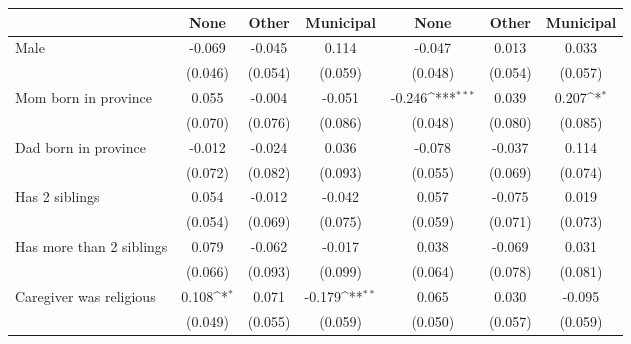 {
\def\sym#1{\ifmmode^{#1}\else\(^{#1}\)\fi}
\begin{tabular}{l*{6}{c}}
\toprule
                    &\multicolumn{1}{c}{None}&\multicolumn{1}{c}{Other}&\multicolumn{1}{c}{Municipal}&\multicolumn{1}{c}{None}&\multicolumn{1}{c}{Other}&\multicolumn{1}{c}{Municipal}\\
\midrule
Male                &      -0.069         &      -0.045         &       0.114         &      -0.047         &       0.013         &       0.033         \\
                    &     (0.046)         &     (0.054)         &     (0.059)         &     (0.048)         &     (0.054)         &     (0.057)         \\
\addlinespace
Mom born in province&       0.055         &      -0.004         &      -0.051         &      -0.246\sym{***}&       0.039         &       0.207\sym{*}  \\
                    &     (0.070)         &     (0.076)         &     (0.086)         &     (0.048)         &     (0.080)         &     (0.085)         \\
\addlinespace
Dad born in province&      -0.012         &      -0.024         &       0.036         &      -0.078         &      -0.037         &       0.114         \\
                    &     (0.072)         &     (0.082)         &     (0.093)         &     (0.055)         &     (0.069)         &     (0.074)         \\
\addlinespace
Has 2 siblings      &       0.054         &      -0.012         &      -0.042         &       0.057         &      -0.075         &       0.019         \\
                    &     (0.054)         &     (0.069)         &     (0.075)         &     (0.059)         &     (0.071)         &     (0.073)         \\
\addlinespace
Has more than 2 siblings&       0.079         &      -0.062         &      -0.017         &       0.038         &      -0.069         &       0.031         \\
                    &     (0.066)         &     (0.093)         &     (0.099)         &     (0.064)         &     (0.078)         &     (0.081)         \\
\addlinespace
Caregiver was religious&       0.108\sym{*}  &       0.071         &      -0.179\sym{**} &       0.065         &       0.030         &      -0.095         \\
                    &     (0.049)         &     (0.055)         &     (0.059)         &     (0.050)         &     (0.057)         &     (0.059)         \\

\end{tabular}}
